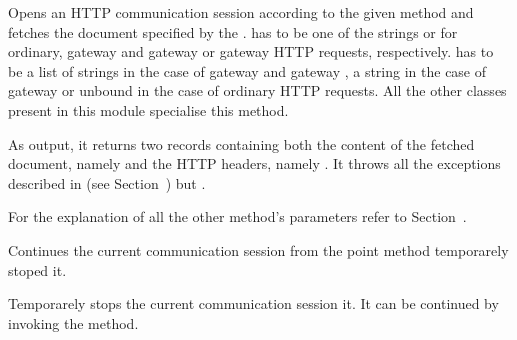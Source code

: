 \documentclass{ozdoc}
\begin{document}
\begin{mozartDESCRIPTION}
\mozartITEM Opens an HTTP communication session according to the given method  and fetches the document specified by the .  has to be one of the strings  or  for ordinary, gateway  and gateway  or gateway  HTTP requests, respectively.  has to be a list of  strings in the case of gateway  and gateway , a  string in the case of gateway  or unbound in the case of ordinary HTTP requests. All the other classes present in this module specialise this method.

As output, it returns two records containing both the content of the fetched document, namely  and the HTTP headers, namely . It throws all the exceptions described in (see Section~) but .

For the explanation of all the other method's parameters refer to Section~. \mozartEMPTY
{}\mozartENTRYHASCODE
\begin{mozartSYNOPSIS}
\begin{mozartCODEDISPLAY}\end{mozartCODEDISPLAY}
\end{mozartSYNOPSIS}
\mozartITEM Continues the current communication session from the point  method temporarely stoped it. \mozartEMPTY
{}\mozartENTRYHASCODE
\begin{mozartSYNOPSIS}
\begin{mozartCODEDISPLAY}\end{mozartCODEDISPLAY}
\end{mozartSYNOPSIS}
\mozartITEM Temporarely stops the current communication session it. It can be continued by invoking the  method. \mozartEMPTY
\end{mozartDESCRIPTION}


\end{document}
